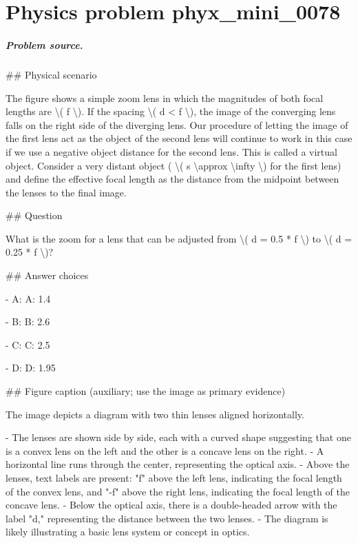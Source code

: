 
\chapter{Physics problem phyx\_mini\_0078}
\label{ch:PhyXMiniProblems_problem_phyx_mini_0078}

\paragraph{Problem source.}
\#\# Physical scenario

The figure shows a simple zoom lens in which the magnitudes of both focal lengths are \textbackslash{}( f \textbackslash{}). If the spacing \textbackslash{}( d < f \textbackslash{}), the image of the converging lens falls on the right side of the diverging lens. Our procedure of letting the image of the first lens act as the object of the second lens will continue to work in this case if we use a negative object distance for the second lens. This is called a virtual object. Consider a very distant object ( \textbackslash{}( s \textbackslash{}approx \textbackslash{}infty \textbackslash{}) for the first lens) and define the effective focal length as the distance from the midpoint between the lenses to the final image.

\#\# Question

What is the zoom for a lens that can be adjusted from \textbackslash{}( d = 0.5 * f \textbackslash{}) to \textbackslash{}( d = 0.25 * f \textbackslash{})?

\#\# Answer choices

- A: A: 1.4

- B: B: 2.6

- C: C: 2.5

- D: D: 1.95

\#\# Figure caption (auxiliary; use the image as primary evidence)

The image depicts a diagram with two thin lenses aligned horizontally. 

- The lenses are shown side by side, each with a curved shape suggesting that one is a convex lens on the left and the other is a concave lens on the right.
- A horizontal line runs through the center, representing the optical axis.
- Above the lenses, text labels are present: "f" above the left lens, indicating the focal length of the convex lens, and "-f" above the right lens, indicating the focal length of the concave lens.
- Below the optical axis, there is a double-headed arrow with the label "d," representing the distance between the two lenses.
- The diagram is likely illustrating a basic lens system or concept in optics.

